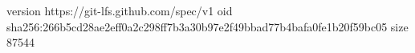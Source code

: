 version https://git-lfs.github.com/spec/v1
oid sha256:266b5cd28ae2eff0a2c298ff7b3a30b97e2f49bbad77b4bafa0fe1b20f59bc05
size 87544
